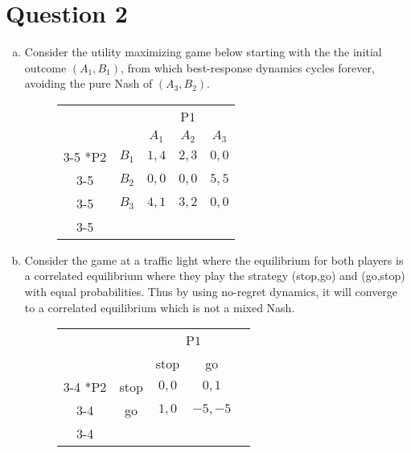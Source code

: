\documentclass[a4paper,12pt]{article}
\theoremstyle{definition}
\begin{document}
\section*{Question 2}
\begin{enumerate}[(a)]
\item 
Consider the utility maximizing game below starting with the the initial outcome $(A_1,B_1)$, from which best-response dynamics cycles forever, avoiding the pure Nash of $(A_3,B_2)$.
\begin{figure}[h]
\renewcommand{\arraystretch}{1.5}
    \centering
    \begin{tabular}{cc|c|c|c|}
      & \multicolumn{1}{c}{} & \multicolumn{3}{c}{P$1$}\\
      & \multicolumn{1}{c}{} & \multicolumn{1}{c}{$A_1$}  & \multicolumn{1}{c}{$A_2$} &\multicolumn{1}{c}{$A_3$}\\\cline{3-5}
      \multirow{3}*{P$2$}  & $B_1$ & $1,4$ & $2,3$& $0,0$\\\cline{3-5}
      \cline{3-5}
& $B_2$ & $0,0$ & $0,0$& $5,5$\\\cline{3-5}
      & $B_3$ & $4,1$ & $3,2$ &$0,0$\\\cline{3-5}
    \end{tabular}
 \end{figure}   

\item Consider the game at a traffic light where the equilibrium for both players is a correlated equilibrium where they play the strategy (stop,go) and (go,stop) with equal probabilities. Thus by using no-regret dynamics, it will converge to a correlated equilibrium which is not a mixed Nash.
 \begin{figure}[h]
\renewcommand{\arraystretch}{1.5}
    \centering
    \begin{tabular}{cc|c|c|c|}
      & \multicolumn{1}{c}{} & \multicolumn{2}{c}{P$1$}\\
      & \multicolumn{1}{c}{} & \multicolumn{1}{c}{stop}  & \multicolumn{1}{c}{go} \\\cline{3-4}
      \multirow{2}*{P$2$}  & stop & $0,0$ & $0,1$\\\cline{3-4}
      \cline{3-4}
& go & $1,0$ & $-5,-5$\\      \cline{3-4}
    \end{tabular}
 \end{figure}   


\end{enumerate}
\end{document}
